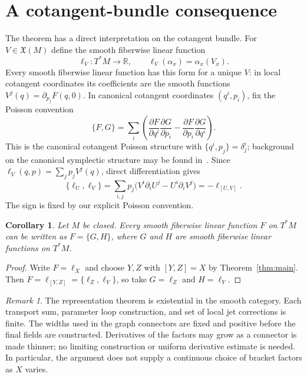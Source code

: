 \documentclass[11pt]{article}
\newcommand{\Vect}{\mathfrak{X}}
\newtheorem{corollary}[theorem]{Corollary}
\theoremstyle{remark}
\newtheorem{remark}[theorem]{Remark}
\begin{document}
\section{A cotangent-bundle consequence}\label{sec:cotangent}

The theorem has a direct interpretation on the cotangent bundle. For $V\in\Vect(M)$ define the smooth fiberwise linear function
$$
 \ell_V:T^*M\longrightarrow\mathbb R,\qquad
 \ell_V(\alpha_x)=\alpha_x(V_x).
$$
Every smooth fiberwise linear function has this form for a unique $V$: in local cotangent coordinates its coefficients are the smooth functions $V^j(q)=\partial_{p_j}F(q,0)$. In canonical cotangent coordinates $(q^i,p_i)$, fix the Poisson convention
$$
 \{F,G\}=\sum_i\left(
 \frac{\partial F}{\partial q^i}\frac{\partial G}{\partial p_i}
 -\frac{\partial F}{\partial p_i}\frac{\partial G}{\partial q^i}
 \right).
$$
This is the canonical cotangent Poisson structure with $\{q^i,p_j\}=\delta^i_j$; background on the canonical symplectic structure may be found in~\cite[Chapter~22]{Lee2013}. Since $\ell_V(q,p)=\sum_jp_jV^j(q)$, direct differentiation gives
$$
 \{\ell_U,\ell_V\}
 =\sum_{i,j}p_j\bigl(V^i\partial_iU^j-U^i\partial_iV^j\bigr)
 =-\ell_{[U,V]}.
$$
The sign is fixed by our explicit Poisson convention.

\begin{corollary}\label{cor:cotangent} 
Let $M$ be closed. Every smooth fiberwise linear function $F$ on $T^*M$ can be written as $F=\{G,H\}$, where $G$ and $H$ are smooth fiberwise
linear functions on $T^*M$.
\end{corollary}

\begin{proof}
Write $F=\ell_X$ and choose $Y,Z$ with $[Y,Z]=X$ by Theorem~\ref{thm:main}. Then $F=\ell_{[Y,Z]}=\{\ell_Z,\ell_Y\}$, so take $G=\ell_Z$ and $H=\ell_Y$.
\end{proof}

\begin{remark}
The representation theorem is existential in the smooth category. Each transport sum, parameter loop construction, and set of local jet corrections is finite. The widths used in the graph connectors are fixed and positive before the final fields are constructed. Derivatives of the factors may grow as a connector is made thinner; no limiting construction or uniform derivative estimate is needed. In particular, the argument does not supply a continuous choice of bracket factors as $X$ varies.
\end{remark}


\printbibliography
\end{document}

